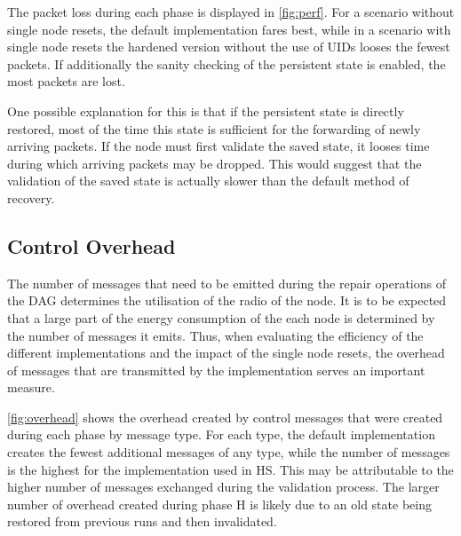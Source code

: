 The packet loss during each phase is displayed in \autoref{fig:perf}. For a
scenario without single node resets, the default implementation fares best,
while in a scenario with single node resets the hardened version without the use
of \acp{UID} looses the fewest packets. If additionally the sanity checking
of the persistent state is enabled, the most packets are lost.

One possible explanation for this is that if the persistent state is directly
restored, most of the time this state is sufficient for the forwarding of newly
arriving packets. If the node must first validate the saved state, it looses
time during which arriving packets may be dropped. This would suggest that the
validation of the saved state is actually slower than the default method of
recovery.

\subsection{Control Overhead}

The number of messages that need to be emitted during the repair operations of
the \ac{DAG} determines the utilisation of the radio of the node. It is to be
expected that a large part of the energy consumption of the each node is
determined by the number of messages it emits. Thus, when evaluating the
efficiency of the different implementations and the impact of the single node
resets, the overhead of messages that are transmitted by the implementation
serves an important measure.

\autoref{fig:overhead} shows the overhead created by control messages that were created
during each phase by message type. For each type, the default implementation
creates the fewest additional messages of any type, while the number of messages
is the highest for the implementation used in HS. This may be attributable to
the higher number of messages exchanged during the validation process. The
larger number of overhead created during phase H is likely due to an old state
being restored from previous runs and then invalidated.

